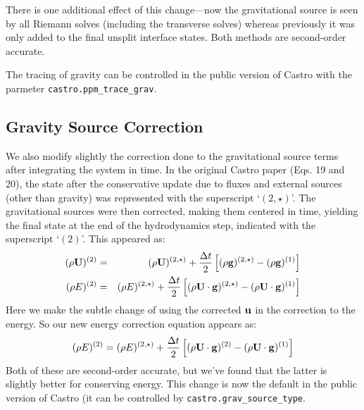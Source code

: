 \documentclass[12pt,preprint]{aastex}
\begin{document}
There is one additional effect of this change---now the gravitational
source is seen by all Riemann solves (including the transverse solves)
whereas previously it was only added to the final unsplit interface
states.  Both methods are second-order accurate.

The tracing of gravity can be controlled in the public version of Castro
with the parmeter {\tt castro.ppm\_trace\_grav}.



\subsection{Gravity Source Correction}

We also modify slightly the correction done to the gravitational
source terms after integrating the system in time.  In the original
Castro paper (Eqs. 19 and 20), the state after the conservative update
due to fluxes and external sources (other than gravity) was
represented with the superscript `$(2,\star)$'.  The gravitational
sources were then corrected, making them centered in time, yielding
the final state at the end of the hydrodynamics step, indicated with
the superscript `$(2)$'.  This appeared as:
\begin{eqnarray}
(\rho {\bf U})^{(2)} &=& (\rho {\bf U})^{(2,\star)} +
   \frac{\Delta t}{2} \left [ (\rho {\bf g})^{(2,\star)} - 
                              (\rho {\bf g})^{(1)} \right ]\\
(\rho E)^{(2)} &=& (\rho E)^{(2,\star)} +
   \frac{\Delta t}{2} \left [ (\rho {\bf U\cdot g})^{(2,\star)} - 
                              (\rho {\bf U\cdot g})^{(1)} \right ]
\end{eqnarray}
Here we make the subtle change of using the corrected ${\bf u}$ in the
correction to the energy.  So our new energy correction equation appears as:
\begin{equation}
(\rho E)^{(2)} = (\rho E)^{(2,\star)} +
   \frac{\Delta t}{2} \left [ (\rho {\bf U\cdot g})^{(2)} - 
                              (\rho {\bf U\cdot g})^{(1)} \right ]
\end{equation}
Both of these are second-order accurate, but we've found that the
latter is slightly better for conserving energy.  This change is now
the default in the public version of Castro (it can be controlled by
{\tt castro.grav\_source\_type}.
\end{document}
